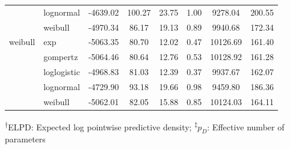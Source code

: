 \documentclass[AMA,STIX1COL]{WileyNJD-v2}
\begin{document}
\begin{table}[H]
\begin{tabular}{l l c c c c c c}
 & lognormal & -4639.02 & 100.27 & 23.75 & 1.00 & 9278.04 & 200.55\\
 & weibull & -4970.34 & 86.17 & 19.13 & 0.89 & 9940.68 & 172.34\\
weibull & exp & -5063.35 & 80.70 & 12.02 & 0.47 & 10126.69 & 161.40\\
 & gompertz & -5064.46 & 80.64 & 12.76 & 0.53 & 10128.92 & 161.28\\
 & loglogistic & -4968.83 & 81.03 & 12.39 & 0.37 & 9937.67 & 162.07\\
 & lognormal & -4729.90 & 93.18 & 19.66 & 0.98 & 9459.80 & 186.36\\
 & weibull & -5062.01 & 82.05 & 15.88 & 0.85 & 10124.03 & 164.11\\
\bottomrule
\end{tabular}
\begin{tablenotes}%
\textsuperscript{$\dagger$}ELPD: Expected log pointwise predictive density;
\textsuperscript{$\ddagger$}$p_D$: Effective number of parameters
\end{tablenotes}
\end{table}
\end{document}
